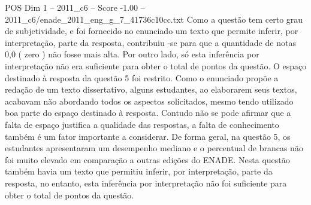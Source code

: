 \begin{textsample}{POS Dim 1 – 2011\_c6 – Score -1.00 – 2011\_c6/enade\_2011\_eng\_g\_7\_41736c10cc.txt}
Como a questão tem certo grau de subjetividade, e foi fornecido no enunciado um texto que permite inferir, por interpretação, parte da resposta, contribuiu -se para que a quantidade de notas 0,0 ( zero ) não fosse mais alta.
Por outro lado, só esta inferência por interpretação não era suficiente para obter o total de pontos da questão.
O espaço destinado à resposta da questão 5 foi restrito.
Como o enunciado propõe a redação de um texto dissertativo, alguns estudantes, ao elaborarem seus textos, acabavam não abordando todos os aspectos solicitados, mesmo tendo utilizado boa parte do espaço destinado à resposta.
Contudo não se pode afirmar que a falta de espaço justifica a qualidade das respostas, a falta de conhecimento também é um fator importante a considerar.
De forma geral, na questão 5, os estudantes apresentaram um desempenho mediano e o percentual de brancas não foi muito elevado em comparação a outras edições do ENADE.
Nesta questão também havia um texto que permitiu inferir, por interpretação, parte da resposta, no entanto, esta inferência por interpretação não foi suficiente para obter o total de pontos da questão.

\end{textsample}
